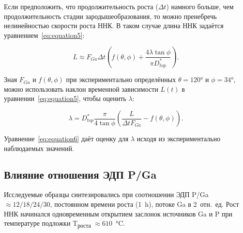 Если предположить, что продолжительность роста (\(\Delta t\)) намного больше,
чем продолжительность стадии зародышеобразования, то можно пренебречь
нелинейностью скорости роста ННК. В таком случае длина ННК задаётся
уравнением~\ref{eq:equation5}:

\begin{equation} \label{eq:equation5} L\approx F_{Ga} \Delta t \left(
	f(\theta,\phi) + \frac{4 \lambda \tan{\phi}}{\pi D_{top}^\ast} \right).
\end{equation}

Зная \(F_ {Ga}\) и \(f(\theta,\phi)\) при экспериментально определённых
\(\theta = 120\si{\degree}\) и \(\phi = 34\si{\degree}\), можно использовать
наклон временной зависимости \(L(t)\) в уравнении~\ref{eq:equation5}, чтобы
оценить \(\lambda\):

\begin{equation} \label{eq:equation6} \lambda=D_{top}^\ast
	\frac{\pi}{4\tan{\phi}} \left( \frac{L}{\Delta t F_{Ga}}-f(\theta,\phi)
\right).  \end{equation}

Уравнение~\ref{eq:equation6} даёт оценку для \(\lambda\) исходя из
экспериментально наблюдаемых значений.

\subsection{Влияние отношения ЭДП P/Ga}\label{subsec:ch6/sec2/sub3}


Исследуемые образцы синтезировались при соотношении ЭДП P/Ga \(\approx
12/18/24/30\), постоянном времени роста (1~\si{\hour}), потоке Ga в 2~отн.~ед.
Рост ННК начинался одновременным открытием заслонок источников Ga и P при
температуре подложки T\textsubscript{роста} \(\approx
610\)~\si{\degreeCelsius}.

